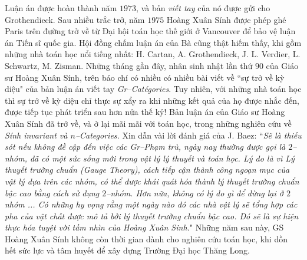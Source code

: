 \begin{multicols}{2}
	\vskip 0.1cm
	Luận án được hoàn thành năm $1973$, và bản \textit{viết tay} của nó được gửi cho Grothendieck. Sau nhiều trắc trở, năm $1975$ Hoàng Xuân Sính được phép ghé Paris trên đường trở về từ Đại hội toán học thế giới ở Vancouver để bảo vệ luận án Tiến sĩ quốc gia. Hội đồng chấm luận án của Bà cũng thật hiếm thấy, khi gồm những nhà toán học nổi tiếng nhất: H. Cartan, A. Grothendieck,  J. L. Verdier, L. Schwartz, M. Zisman.
	\vskip 0.1cm
	Những tháng gần đây, nhân sinh nhật lần thứ $90$ của Giáo sư Hoàng Xuân Sính,   trên báo chí có nhiều có nhiều bài viết về ``sự trở về kỳ diệu" của bản luận án viết tay \textit{Gr--Catégories}. Tuy nhiên, với những nhà toán học thì sự trở về kỳ diệu chỉ thực sự xẩy ra khi những kết quả của họ được nhắc đến, được tiếp tục phát triển sau hơn nửa thế kỷ! Bản luận án của Giáo sư Hoàng Xuân Sính đã trở về, và ở lại mãi mãi với toán học, trong những nghiên cứu về \textit{Sính invariant và $n$--Categories.}
	\vskip 0.1cm
	Xin dẫn vài lời đánh giá của  J. Baez:
	\vskip 0.1cm
	``\textit{Sẽ là thiếu sót nếu không đề cập đến việc các Gr--Phạm trù,  ngày nay thường được gọi là $2$--nhóm,  đã có một sức sống mới trong vật lý lý thuyết và toán học.
	\vskip 0.1cm
	Lý do là vì Lý thuyết trường chuẩn (Gauge Theory), cách tiếp cận thành công ngoạn mục của vật lý dựa trên các nhóm, có thể được khái quát hóa thành lý thuyết trường chuẩn bậc cao bằng cách sử dụng $2$--nhóm.
	\vskip 0.1cm
	Hơn nữa, không có lý do gì để dừng lại ở $2$ nhóm ... Có những hy vọng rằng một ngày nào đó các nhà vật lý sẽ tổng hợp các pha của vật chất được mô tả bởi lý thuyết trường chuẩn bậc cao. Đó sẽ là sự hiện thực hóa tuyệt vời tầm nhìn của Hoàng Xuân Sinh.}"
	\vskip 0.1cm
	\columnbreak
	Những năm sau này, GS Hoàng Xuân Sính không còn thời gian dành cho nghiên cứu toán học, khi dồn hết sức lực và tâm huyết để xây dựng Trường Đại học Thăng Long. 
	\begin{figure}[H]
		\vspace*{-5pt}
		\centering
		\captionsetup{labelformat= empty, justification=centering}

\end{figure}
\end{multicols}
